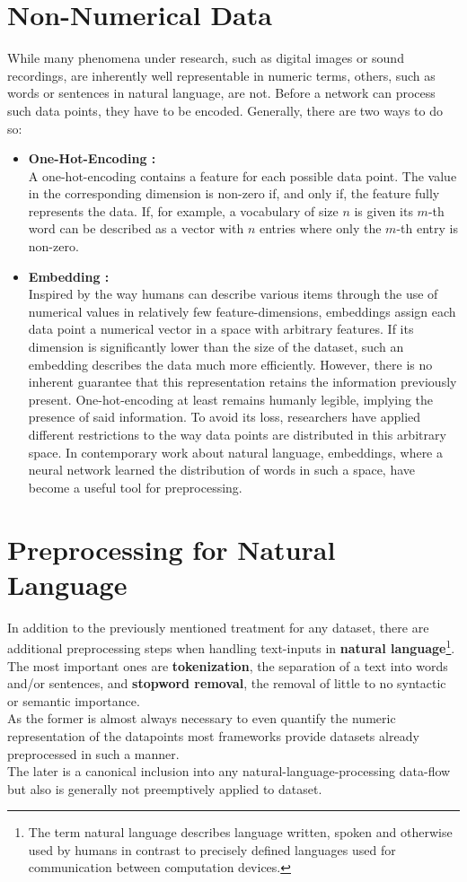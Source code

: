 \section{Non-Numerical Data}
While many phenomena under research, such as digital images or sound recordings, are inherently well representable in numeric terms, others, such as words or sentences in natural language, are not. Before a network can process such data points, they have to be encoded.
Generally, there are two ways to do so:
\begin{itemize}
	\item \textbf{One-Hot-Encoding :}\\
	A one-hot-encoding contains a feature for each possible data point. The value in the corresponding dimension is non-zero if, and only if, the feature fully represents the data.
	If, for example, a vocabulary of size $n$ is given its $m$-th word can be described as a vector with $n$ entries where only the $m$-th entry is non-zero.\\
	\item \textbf{Embedding :}\\
	Inspired by the way humans can describe various items through the use of numerical values in relatively few feature-dimensions, embeddings assign each data point a numerical vector in a space with arbitrary features. If its dimension is significantly lower than the size of the dataset, such an embedding describes the data much more efficiently. However, there is no inherent guarantee that this representation retains the information previously present. One-hot-encoding at least remains humanly legible, implying the presence of said information. To avoid its loss, researchers have applied different restrictions to the way data points are distributed in this arbitrary space.
	In contemporary work about natural language, embeddings, where a neural network learned the distribution of words in such a space, have become a useful tool for preprocessing. \cite{Word2Vec}
\end{itemize} 

\section{Preprocessing for Natural Language}
In addition to the previously mentioned treatment for any dataset, there are additional preprocessing steps when handling text-inputs in \textbf{natural language}\footnote{The term natural language describes language written, spoken and otherwise used by humans in contrast to precisely defined languages used for communication between computation devices.}. The most important ones are \textbf{tokenization}, the separation of a text into words and/or sentences, and \textbf{stopword removal}, the removal of little to no syntactic or semantic importance.\\
As the former is almost always necessary to even quantify the numeric representation of the datapoints most frameworks provide datasets already preprocessed in such a manner.\\
The later is a canonical inclusion into any natural-language-processing data-flow but also is generally not preemptively applied to dataset.